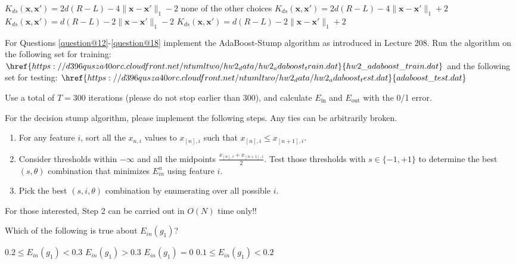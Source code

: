 \documentclass[a4paper,10pt]{exam}
\begin{document}
\begin{questions}
	\begin{checkboxes}
		\choice $K_{ds}(\mathbf{x}, \mathbf{x}') = 2d(R-L) - 4\|\mathbf{x}-\mathbf{x}'\|_1 - 2$
		\choice none of the other choices
		\CorrectChoice $K_{ds}(\mathbf{x}, \mathbf{x}') = 2d(R-L) - 4\|\mathbf{x}-\mathbf{x}'\|_1 + 2$
		\choice $K_{ds}(\mathbf{x}, \mathbf{x}') = d(R-L) - 2\|\mathbf{x}-\mathbf{x}'\|_1 - 2$
		\choice $K_{ds}(\mathbf{x}, \mathbf{x}') = d(R-L) - 2\|\mathbf{x}-\mathbf{x}'\|_1 + 2$\\
	\end{checkboxes}

	\question For Questions \ref{question@12}-\ref{question@18}  implement the AdaBoost-Stump algorithm as introduced in Lecture 208. Run the algorithm on the following set for training: $\href{https://d396qusza40orc.cloudfront.net/ntumltwo/hw2_data/hw2_adaboost_train.dat}{hw2\_adaboost\_train.dat}$ and the following set for testing: $\href{https://d396qusza40orc.cloudfront.net/ntumltwo/hw2_data/hw2_adaboost_test.dat}{adaboost\_test.dat}$

	Use a total of $T=300$ iterations (please do not stop earlier than 300), and calculate $E_\text{in}$ and $E_\text{out}$ with the 0/1 error.

	For the decision stump algorithm, please implement the following steps. Any ties can be arbitrarily broken.
	\begin{enumerate}
		\item For any feature $i$, sort all the $x_{n, i}$ values to $x_{[n], i}$ such that $x_{[n], i} \le x_{[n+1], i}$.
		\item  Consider thresholds within $-\infty$ and all the midpoints $\frac{x_{[n], i} + x_{[n+1], i}}{2}$. Test those thresholds with $s \in \{-1, +1\}$ to determine the best $(s,\theta)$ combination that minimizes $E_{in}^u$ using feature $i$.
		\item  Pick the best $(s,i,\theta)$ combination by enumerating over all possible $i$.

	\end{enumerate}
	For those interested, Step 2 can be carried out in $O(N)$ time only!!

	Which of the following is true about $E_{in}(g_1)$?

	\begin{checkboxes}
		\CorrectChoice $0.2 \le E_{in}(g_1) < 0.3$
		\choice $E_{in}(g_1) > 0.3$
		\choice $E_{in}(g_1) = 0$
		\choice 0
		\choice $0.1 \le E_{in}(g_1) < 0.2$\\
	\end{checkboxes}


\end{questions}
\end{document}
